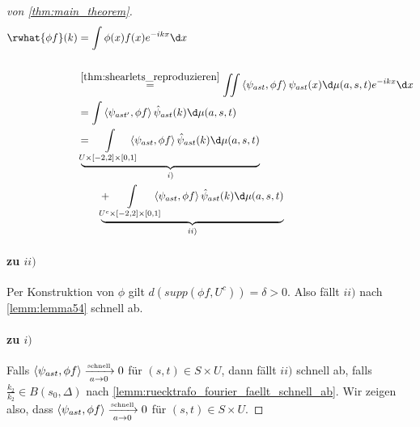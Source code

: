 \begin{proof}[von \ref{thm:main_theorem}]
\begin{align*}
    \rwhat{\phi f} (k)
    &=
    \int \phi(x) f(x) e^{-ikx} \d x \\
    \\&\stackrel{\eqref{thm:shearlets_reproduzieren}}{=}
    \iint \left\langle \psi_{ast},\phi f \right\rangle
        \psi_{ast} (x) \d \mu (a,s,t)
        e^{-ikx} \d x
    \\ &=
    \int \left\langle \psi_{ast'},\phi f \right\rangle
    \hat\psi_{ast}(k) \d \mu(a,s,t)
    \\&= \kern -1em
    \underbrace{
        \int \limits_{U \times [-2,2] \times [0,1]} \kern -1em
        \left\langle \psi_{ast},\phi f \right\rangle
        \hat\psi_{ast}(k) \d \mu(a,s,t)
    }_{i)}
    \\& \kern 2em+ \kern -1em
    \underbrace{
        \int \limits_{U^c \times [-2,2] \times [0,1]} \kern -1em
        \left\langle \psi_{ast},\phi f \right\rangle
        \hat\psi_{ast}(k) \d \mu(a,s,t)
    }_{ii)}
\end{align*}

\paragraph*{zu $ii)$}
Per Konstruktion von $\phi$ gilt $d(supp(\phi f, U^c)) = \delta > 0$. Also fällt $ii)$ nach \cref{lemm:lemma54} schnell ab.

\paragraph*{zu $i)$}
Falls $\left<\psi_{ast},\phi f\right> \xrightarrow[a \to 0]{\text{\tiny schnell}} 0$ für $(s,t) \in S \times U$, dann fällt $ii)$ schnell ab, falls $\frac{k_2}{k_2} \in B(s_0,\Delta)$ nach \cref{lemm:ruecktrafo_fourier_faellt_schnell_ab}. Wir zeigen also, dass $\left<\psi_{ast},\phi f\right> \xrightarrow[a \to 0]{\text{\tiny schnell}} 0$ für $(s,t) \in S \times U$.


\end{proof}

